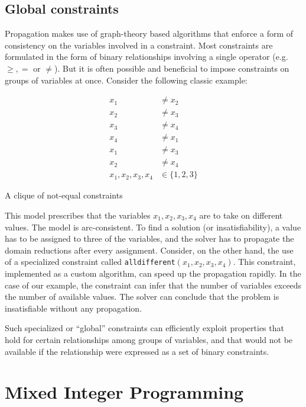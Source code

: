 \documentclass[13pt, letterpaper, oneside]{book}
\begin{document}
\subsection{Global constraints}
Propagation makes use of graph-theory based algorithms that enforce a form of
consistency on the variables involved in a constraint. Most constraints are
formulated in the form of binary relationships involving a single operator (e.g.
$\geq, =$ or $\neq$). But it is often possible and beneficial to impose
constraints on groups of variables at once. Consider the following classic
example:
\begin{model}[h!]
\begin{align}
x_1 &\neq x_2\\
x_2 &\neq x_3\\
x_3 &\neq x_4\\
x_4 &\neq x_1\\
x_1 &\neq x_3\\
x_2 &\neq x_4\\
x_1, x_2, x_3, x_4 &\in \{1, 2, 3\}
\end{align}
\caption{A clique of not-equal constraints}
\label{mod:cpalldiff}
\end{model}
This model prescribes that the variables $x_1, x_2, x_3, x_4$ are to take on
different values. The model is arc-consistent. To find a solution (or
insatisfiability), a value has to be assigned to three of the variables, and the
solver has to propagate the domain reductions after every assignment. Consider,
on the other hand, the use of a specialized constraint called
\texttt{alldifferent}$(x_1, x_2, x_3, x_4)$. This constraint, implemented as a
custom algorithm, can speed up the propagation rapidly. In the case of our
example, the constraint can infer that the number of variables exceeds the
number of available values. The solver can conclude that the problem is
insatisfiable without any propagation.

Such specialized or ``global'' constraints can efficiently exploit properties
that hold for certain relationships among groups of variables, and that would
not be available if the relationship were expressed as a set of binary
constraints.
 
\section{Mixed Integer Programming}
\label{sec:backgroundmip}
\end{document}
